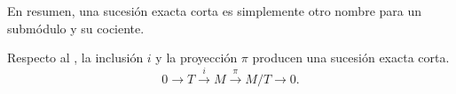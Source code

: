 En resumen, una sucesión exacta corta es simplemente otro nombre para un submódulo
y su cociente.

\begin{ejemplo}
	Respecto al , la inclusión \(i\) y la proyección \(\pi\) producen
	una sucesión exacta corta.
	\[
	0 \rightarrow T \xrightarrow{i}M \xrightarrow{\pi}M/T \rightarrow 0.
	\]
\end{ejemplo}
%
%
%
%
